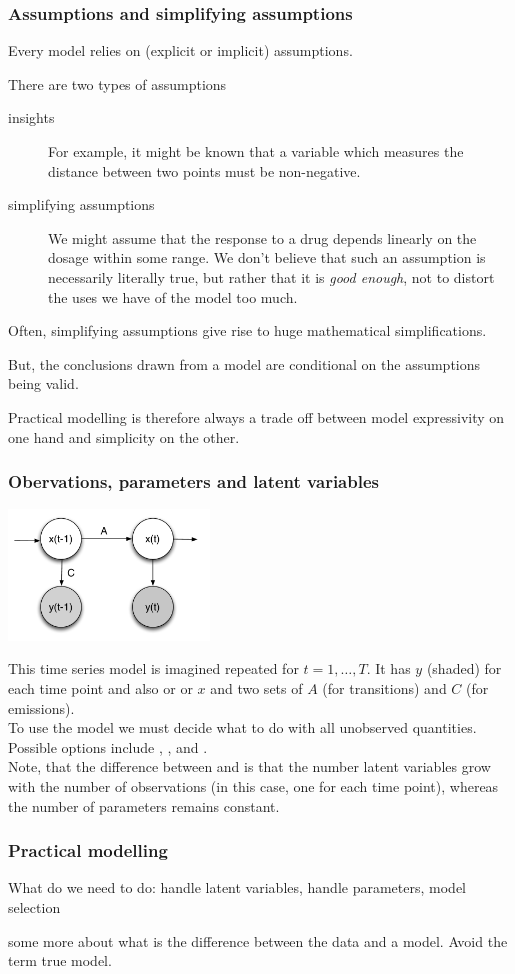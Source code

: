 \begin{frame}
\frametitle{Assumptions and simplifying assumptions}

Every model relies on (explicit or implicit) assumptions.


There are two types of assumptions
\begin{description}
\item[insights] For example, it might be known that a variable which measures the distance between two points must be non-negative.
\item[simplifying assumptions] We might assume that the response to a drug depends linearly on the dosage within some range. We don't believe that such an assumption is necessarily literally true, but rather that it is \emph{good enough}, not to distort the uses we have of the model too much.
\end{description}

Often, simplifying assumptions give rise to huge mathematical simplifications.

But, the conclusions drawn from a model are conditional on the assumptions being valid.

Practical modelling is therefore always a trade off between model expressivity on one hand and simplicity on the other.
\end{frame}


\begin{frame}
\frametitle{Obervations, parameters and latent variables}

\centerline{\includegraphics[width=0.4\textwidth]{d1.pdf}}

This time series model is imagined repeated for $t=1,\ldots,T$. It has  $y$ (shaded) for each time point and also  or  or  $x$ and two sets of  $A$ (for transitions) and $C$ (for emissions).\\[1ex]

To use the model we must decide what to do with all unobserved quantities. Possible options include , ,  and .\\[1ex]

Note, that the difference between  and  is that the number latent variables grow with the number of observations (in this case, one for each time point), whereas the number of parameters remains constant.
\end{frame}


\begin{frame}
\frametitle{Practical modelling}

What do we need to do: handle latent variables, handle parameters, model selection
\end{frame}

\begin{frame}
some more about what is the difference between the data and a model. Avoid the term true model.
\end{frame}


  